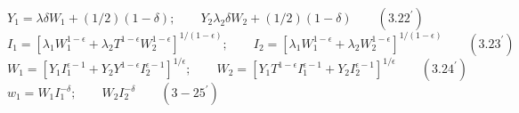 $Y_1 = \lambda \delta W_1 + (1/2)(1-\delta);\qquad Y_2\lambda_2 \delta W_2 + (1/2)(1-\delta)\qquad (3.22^{'})$\\

$I_1 = \left[\lambda_1W_1^{1-\epsilon}+\lambda_2 T^{1-\epsilon} W_2^{1-\epsilon}\right]^{1/(1-\epsilon)}; \qquad I_2=\left[\lambda_1W_1^{1-\epsilon}+\lambda_2 W_2^{1-\epsilon}\right]^{1/(1-\epsilon)}\qquad (3.23^{'})$\\

$W_1 = \left[Y_1I_1^{\epsilon-1}+Y_2Y^{1-\epsilon} I_2^{\epsilon-1}\right]^{1/\epsilon}; \qquad W_2 = \left[Y_1 T^{1-\epsilon}I_1^{\epsilon-1}+Y_2I_2^{\epsilon-1}\right]^{1/\epsilon}\qquad (3.24^{'})$\\

$w_1=W_1I_1^{-\delta};\qquad W_2I_2^{-\delta}\qquad (3-25^{'})$


